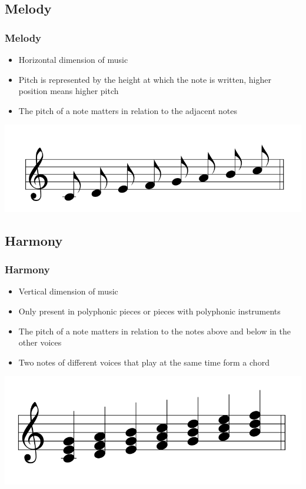 \documentclass[english]{beamer}
\begin{document}
\subsection{Melody}
	\begin{frame}
		\frametitle{Melody}
		\begin{itemize}
			\item Horizontal dimension of music
			\item Pitch is represented by the height at which the note is written, higher position means higher pitch
			\item The pitch of a note matters in relation to the adjacent notes
		\end{itemize}
		\begin{center}
			\includegraphics[width=0.6\linewidth]{imagenes/C_scale.png}
		\end{center}
	\end{frame}
\subsection{Harmony}
	\begin{frame}
		\frametitle{Harmony}
		\begin{itemize}
			\item Vertical dimension of music
			\item Only present in polyphonic pieces or pieces with polyphonic instruments
			\item The pitch of a note matters in relation to the notes above and below in the other voices
			\item Two notes of different voices that play at the same time form a chord
		\end{itemize}
		\begin{center}
			\includegraphics[width=0.6\linewidth]{imagenes/C_chords.png}
		\end{center}
		
	\end{frame}
\end{document}
